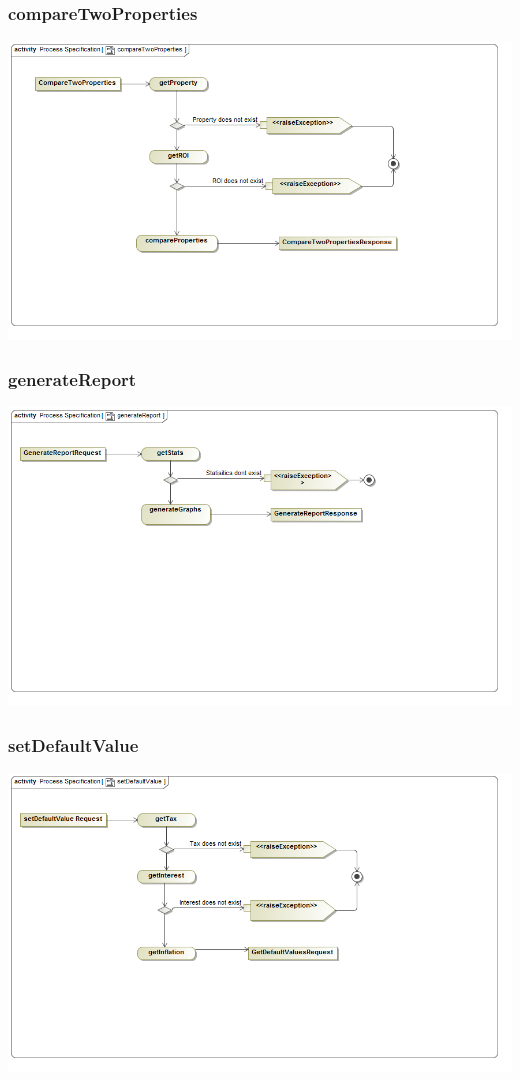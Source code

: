 \documentclass[a4paper,12pt]{article}
\begin{document}
\subsubsection{compareTwoProperties}
\includegraphics[width=1\textwidth]{./Images/processSpecification/compareTwoProperties.png}
\subsubsection{generateReport}
\includegraphics[width=1\textwidth]{./Images/processSpecification/generateReport.png}
\subsubsection{setDefaultValue}
\includegraphics[width=1\textwidth]{./Images/processSpecification/setDefaultValue.png}
\end{document}
